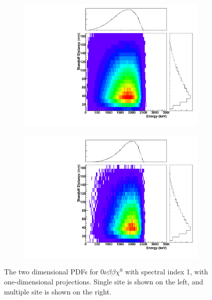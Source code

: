 \documentclass[herrin-thesis.tex]{subfiles}
\begin{document}
\begin{figure}[hp]
\centering
	\begin{subfigure}[b]{0.48\textwidth}
	\centering
	\includegraphics[width=\textwidth]{./plots/PDFs/analysis_pdf_bb0nX1_ss.pdf}
\end{subfigure}\hfill%
\begin{subfigure}[b]{0.48\textwidth}
	\centering
	\includegraphics[width=1\textwidth]{./plots/PDFs/analysis_pdf_bb0nX1_ms.pdf}
	\end{subfigure}
\caption[PDF for \twonu{}]{The two dimensional PDFs for \(0\nu\beta\beta\chi^{0}\) with spectral index 1, with one-dimensional projections. Single site is shown on the left, and multiple site is shown on the right.}
\label{fig:analysis_pdf_bb0nX1}
\end{figure}
\end{document}
